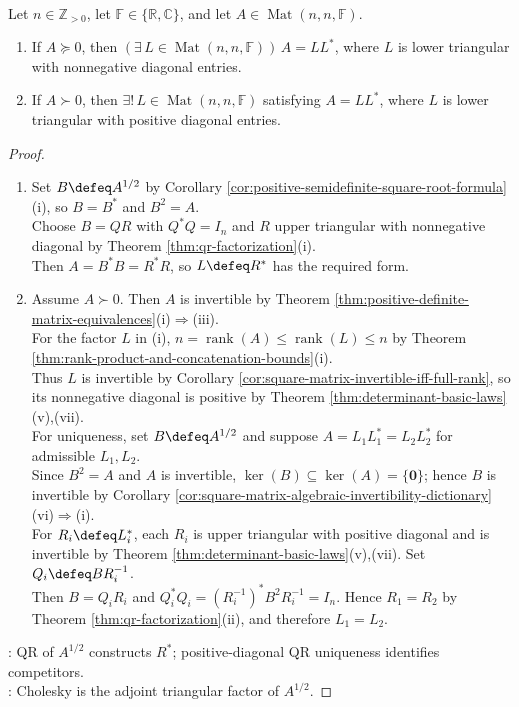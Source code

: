 \begin{theorem} \label{thm:cholesky-factorization} \\
Let $n\in\mathbb{Z}_{>0}$, let $\mathbb{F}\in\{\mathbb{R},\mathbb{C}\}$, and let $A\in\operatorname{Mat}(n,n,\mathbb{F})$.
\begin{enumerate}[label=(\roman*)]
\setlength{\itemsep}{0pt}
\item If $A\succeq0$, then $(\exists\,L\in\operatorname{Mat}(n,n,\mathbb{F}))\,A=LL^*$, where $L$ is lower triangular with nonnegative diagonal entries.
\item If $A\succ0$, then $\exists!\,L\in\operatorname{Mat}(n,n,\mathbb{F})$ satisfying $A=LL^*$, where $L$ is lower triangular with positive diagonal entries.
\end{enumerate}
\begin{proof}
\begin{enumerate}[label=(\roman*)]
\setlength{\itemsep}{0pt}
\item Set $B\defeq A^{1/2}$ by Corollary \ref{cor:positive-semidefinite-square-root-formula}(i), so $B=B^*$ and $B^2=A$.\\
Choose $B=QR$ with $Q^*Q=I_n$ and $R$ upper triangular with nonnegative diagonal by Theorem \ref{thm:qr-factorization}(i).\\
Then $A=B^*B=R^*R$, so $L\defeq R^*$ has the required form.
\item Assume $A\succ0$. Then $A$ is invertible by Theorem \ref{thm:positive-definite-matrix-equivalences}(i)$\Rightarrow$(iii).\\
For the factor $L$ in (i), $n=\operatorname{rank}(A)\leq\operatorname{rank}(L)\leq n$ by Theorem \ref{thm:rank-product-and-concatenation-bounds}(i).\\
Thus $L$ is invertible by Corollary \ref{cor:square-matrix-invertible-iff-full-rank}, so its nonnegative diagonal is positive by Theorem \ref{thm:determinant-basic-laws}(v),(vii).\\
For uniqueness, set $B\defeq A^{1/2}$ and suppose $A=L_1L_1^*=L_2L_2^*$ for admissible $L_1,L_2$.\\
Since $B^2=A$ and $A$ is invertible, $\ker(B)\subseteq\ker(A)=\{\mathbf{0}\}$; hence $B$ is invertible by Corollary \ref{cor:square-matrix-algebraic-invertibility-dictionary}(vi)$\Rightarrow$(i).\\
For $R_i\defeq L_i^*$, each $R_i$ is upper triangular with positive diagonal and is invertible by Theorem \ref{thm:determinant-basic-laws}(v),(vii). Set $Q_i\defeq BR_i^{-1}$.\\
Then $B=Q_iR_i$ and $Q_i^*Q_i=(R_i^{-1})^*B^2R_i^{-1}=I_n$. Hence $R_1=R_2$ by Theorem \ref{thm:qr-factorization}(ii), and therefore $L_1=L_2$.
\end{enumerate}
: QR of $A^{1/2}$ constructs $R^*$; positive-diagonal QR uniqueness identifies competitors.\\
: Cholesky is the adjoint triangular factor of $A^{1/2}$.
\end{proof}
\end{theorem}

